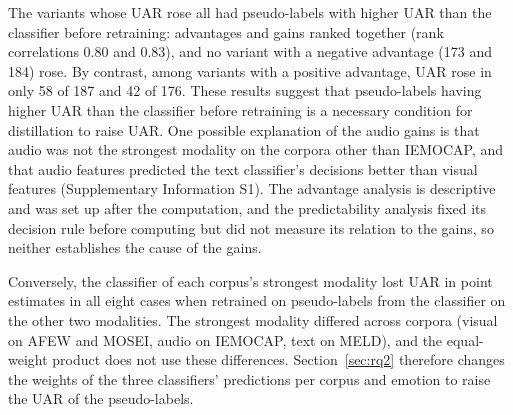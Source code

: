 The variants whose UAR rose all had pseudo-labels with higher UAR than the classifier before retraining: advantages and gains ranked together (rank correlations 0.80 and 0.83), and no variant with a negative advantage (173 and 184) rose. By contrast, among variants with a positive advantage, UAR rose in only 58 of 187 and 42 of 176. These results suggest that pseudo-labels having higher UAR than the classifier before retraining is a necessary condition for distillation to raise UAR. One possible explanation of the audio gains is that audio was not the strongest modality on the corpora other than IEMOCAP, and that audio features predicted the text classifier's decisions better than visual features (Supplementary Information S1). The advantage analysis is descriptive and was set up after the computation, and the predictability analysis fixed its decision rule before computing but did not measure its relation to the gains, so neither establishes the cause of the gains.

Conversely, the classifier of each corpus's strongest modality lost UAR in point estimates in all eight cases when retrained on pseudo-labels from the classifier on the other two modalities. The strongest modality differed across corpora (visual on AFEW and MOSEI, audio on IEMOCAP, text on MELD), and the equal-weight product does not use these differences. Section~\ref{sec:rq2} therefore changes the weights of the three classifiers' predictions per corpus and emotion to raise the UAR of the pseudo-labels.
